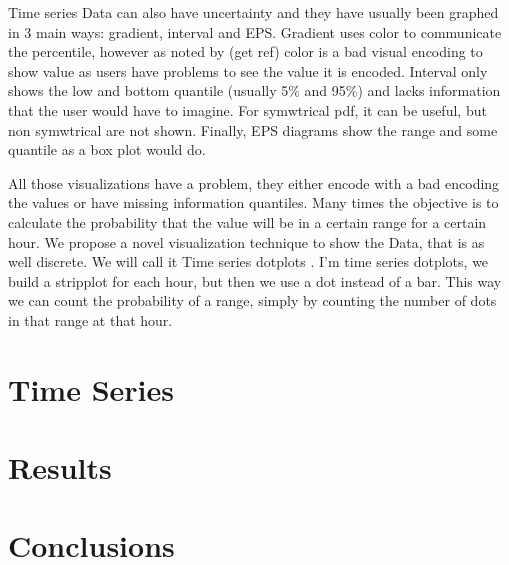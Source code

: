 \documentclass[a4paper,3p,sort&compress]{elsarticle}
\begin{document}
Time series Data can also have uncertainty and they have usually been graphed in 3 main ways: gradient, interval and EPS.
Gradient uses color to communicate the percentile, however as noted by (get ref) color is a bad visual encoding to show value as users have problems to see the value it is encoded.
Interval only shows the low and bottom quantile (usually 5\% and 95\%) and lacks information that the user would have to imagine. For symwtrical pdf, it can be useful, but non symwtrical are not shown.
Finally, EPS diagrams show the range and some quantile as a box plot would do.

All those visualizations have a problem, they either encode with a bad encoding the values or have missing information quantiles. 
Many times the objective is to calculate the probability that the value will be in a certain range for a certain hour.
We propose a novel visualization technique to show the Data, that is as well discrete. We will call it Time series dotplots . I'm time series dotplots, we build a stripplot for each hour, but then we use a dot instead of a bar. This way we can count the probability of a range, simply by counting the number of dots in that range at that hour.

\section{Time Series}
\label{sec:time_series}

\section{Results}
\label{sec:results}

\section{Conclusions}
\label{sec:concl}


\end{document}
